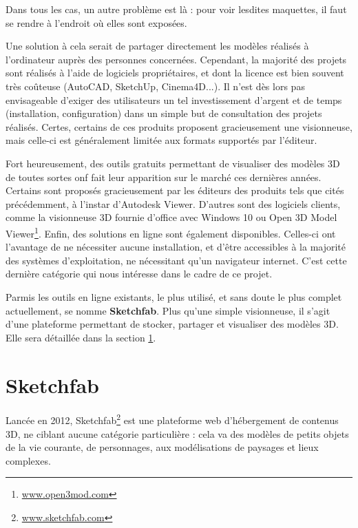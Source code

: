 Dans tous les cas, un autre problème est là : pour voir lesdites maquettes, il faut se rendre à l'endroit où elles sont exposées.

Une solution à cela serait de partager directement les modèles réalisés à l'ordinateur auprès des personnes concernées. Cependant, la majorité des projets sont réalisés à l'aide de logiciels propriétaires, et dont la licence est bien souvent très coûteuse (AutoCAD, SketchUp, Cinema4D...). Il n'est dès lors pas envisageable d'exiger des utilisateurs un tel investissement d'argent et de temps (installation, configuration) dans un simple but de consultation des projets réalisés.
Certes, certains de ces produits proposent gracieusement une visionneuse, mais celle-ci est généralement limitée aux formats supportés par l'éditeur.

Fort heureusement, des outils gratuits permettant de visualiser des modèles 3D de toutes sortes onf fait leur apparition sur le marché ces dernières années. Certains sont proposés gracieusement par les éditeurs des produits tels que cités précédemment, à l'instar d'Autodesk Viewer. D'autres sont des logiciels clients, comme la visionneuse 3D fournie d'office avec Windows 10 ou Open 3D Model Viewer\footnote{\url{www.open3mod.com}}. Enfin, des solutions en ligne sont également disponibles. Celles-ci ont l'avantage de ne nécessiter aucune installation, et d'être accessibles à la majorité des systèmes d'exploitation, ne nécessitant qu'un navigateur internet.
C'est cette dernière catégorie qui nous intéresse dans le cadre de ce projet.

Parmis les outils en ligne existants, le plus utilisé, et sans doute le plus complet actuellement, se nomme \textbf{Sketchfab}. Plus qu'une simple visionneuse, il s'agit d'une plateforme permettant de stocker, partager et visualiser des modèles 3D. Elle sera détaillée dans la section \ref{sketchfab}.

\section{Sketchfab} \label{sketchfab}

Lancée en 2012, Sketchfab\footnote{\url{www.sketchfab.com}} est une plateforme web d'hébergement de contenus 3D, ne ciblant aucune catégorie particulière : cela va des modèles de petits objets de la vie courante, de personnages, aux modélisations de paysages et lieux complexes.

